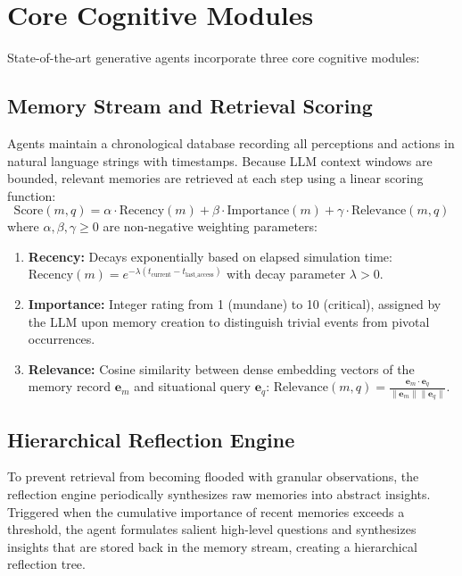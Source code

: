 \documentclass[12pt,a4paper]{report}
\begin{document}
\section{Core Cognitive Modules}
\label{sec:cognitive_modules}

State-of-the-art generative agents incorporate three core cognitive modules:

\subsection{Memory Stream and Retrieval Scoring}
Agents maintain a chronological database recording all perceptions and actions in natural language strings with timestamps. Because LLM context windows are bounded, relevant memories are retrieved at each step using a linear scoring function:
\begin{equation}
\text{Score}(m, q) = \alpha \cdot \text{Recency}(m) + \beta \cdot \text{Importance}(m) + \gamma \cdot \text{Relevance}(m, q)
\end{equation}
where $\alpha, \beta, \gamma \ge 0$ are non-negative weighting parameters:
\begin{enumerate}[label=\arabic*., itemsep=1pt, parsep=0pt, topsep=2pt]
    \item \textbf{Recency:} Decays exponentially based on elapsed simulation time: $\text{Recency}(m) = e^{-\lambda (t_{\text{current}} - t_{\text{last\_access}})}$ with decay parameter $\lambda > 0$.
    \item \textbf{Importance:} Integer rating from 1 (mundane) to 10 (critical), assigned by the LLM upon memory creation to distinguish trivial events from pivotal occurrences.
    \item \textbf{Relevance:} Cosine similarity between dense embedding vectors of the memory record $\mathbf{e}_m$ and situational query $\mathbf{e}_q$: $\text{Relevance}(m, q) = \frac{\mathbf{e}_m \cdot \mathbf{e}_q}{\|\mathbf{e}_m\| \|\mathbf{e}_q\|}$.
\end{enumerate}

\subsection{Hierarchical Reflection Engine}
To prevent retrieval from becoming flooded with granular observations, the reflection engine periodically synthesizes raw memories into abstract insights. Triggered when the cumulative importance of recent memories exceeds a threshold, the agent formulates salient high-level questions and synthesizes insights that are stored back in the memory stream, creating a hierarchical reflection tree.
\end{document}
